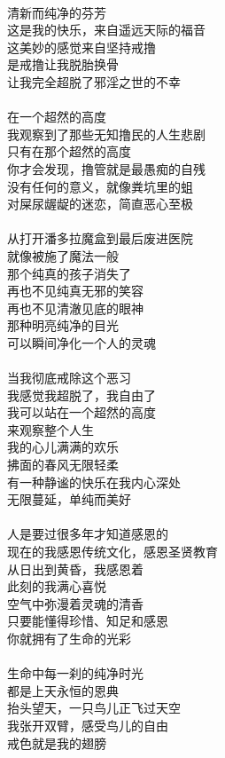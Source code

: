 \begin{poem}[戒行者]
    \begin{multicols}{2}
        \centering~\\
        清新而纯净的芬芳 \\ 这是我的快乐，来自遥远天际的福音 \\ 这美妙的感觉来自坚持戒撸 \\ 是戒撸让我脱胎换骨 \\ 让我完全超脱了邪淫之世的不幸\\~\\
        在一个超然的高度 \\ 我观察到了那些无知撸民的人生悲剧 \\ 只有在那个超然的高度 \\ 你才会发现，撸管就是最愚痴的自残 \\ 没有任何的意义，就像粪坑里的蛆 \\ 对屎尿龌龊的迷恋，简直恶心至极\\~\\
        从打开潘多拉魔盒到最后废进医院 \\ 就像被施了魔法一般 \\ 那个纯真的孩子消失了 \\ 再也不见纯真无邪的笑容 \\ 再也不见清澈见底的眼神 \\ 那种明亮纯净的目光 \\ 可以瞬间净化一个人的灵魂\\~\\
        当我彻底戒除这个恶习 \\ 我感觉我超脱了，我自由了 \\ 我可以站在一个超然的高度 \\ 来观察整个人生 \\ 我的心儿满满的欢乐 \\ 拂面的春风无限轻柔 \\ 有一种静谧的快乐在我内心深处 \\ 无限蔓延，单纯而美好\\~\\
        人是要过很多年才知道感恩的 \\ 现在的我感恩传统文化，感恩圣贤教育 \\ 从日出到黄昏，我感恩着 \\ 此刻的我满心喜悦 \\ 空气中弥漫着灵魂的清香 \\ 只要能懂得珍惜、知足和感恩 \\ 你就拥有了生命的光彩\\~\\
        生命中每一刹的纯净时光 \\ 都是上天永恒的恩典 \\ 抬头望天，一只鸟儿正飞过天空 \\ 我张开双臂，感受鸟儿的自由 \\ 戒色就是我的翅膀
    \end{multicols}
\end{poem}